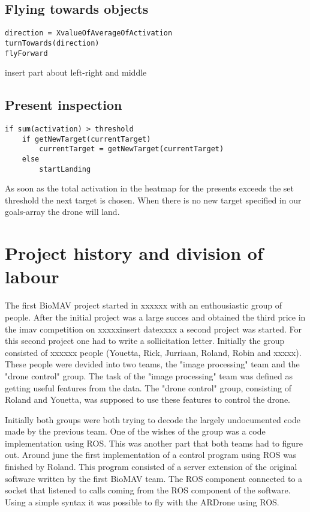 \documentclass[a4paper,10pt]{article}
\begin{document}
\subsection{Flying towards objects}
\begin{verbatim}
direction = XvalueOfAverageOfActivation
turnTowards(direction)
flyForward
\end{verbatim}

insert part about left-right and middle 

\subsection{Present inspection}
\begin{verbatim}
if sum(activation) > threshold
	if getNewTarget(currentTarget)
		currentTarget = getNewTarget(currentTarget)
	else
		startLanding
\end{verbatim}

As soon as the total activation in the heatmap for the presents exceeds the set threshold the next target is chosen. 
When there is no new target specified in our goals-array the drone will land. 

\section{Project history and division of labour}
The first BioMAV project started in xxxxxx with an enthousiastic group of people. After the initial project was a large succes and obtained the third price in the imav competition on xxxxxinsert datexxxx a second project was started.
For this second project one had to write a sollicitation letter. 
Initially the group consisted of xxxxxx people (Youetta, Rick, Jurriaan, Roland, Robin and xxxxx).  
These people were devided into two teams, the "image processing" team and the "drone control" group. 
The task of the "image processing" team was defined as getting useful features from the data. 
The "drone control" group, consisting of Roland and Youetta, was supposed to use these features to control the drone.  

Initially both groups were both trying to decode the largely undocumented code made by the previous team.
One of the wishes of the group was a code implementation using ROS. This was another part that both teams had to figure out.  
Around june the first implementation of a control program using ROS was finished by Roland. 
This program consisted of a server extension of the original software written by the first BioMAV team.  
The ROS component connected to a socket that listened to calls coming from the ROS component of the software. 
Using a simple syntax it was possible to fly with the ARDrone using ROS.  
\end{document}
